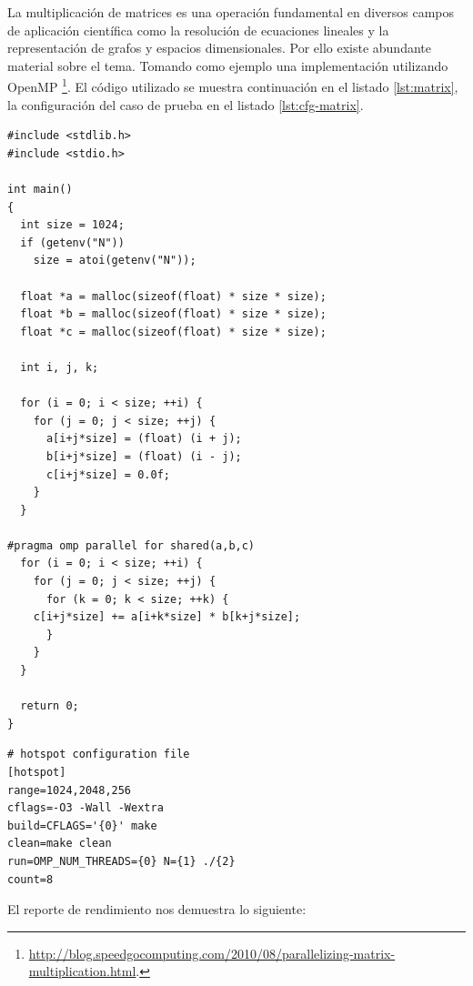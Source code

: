 \documentclass[a4paper]{report}
\begin{document}
La multiplicación de matrices es una operación fundamental en diversos campos de aplicación científica como la resolución de ecuaciones lineales y la representación de grafos y espacios dimensionales. Por ello existe abundante material sobre el tema. Tomando como ejemplo una implementación utilizando OpenMP \footnote{\href{http://blog.speedgocomputing.com/2010/08/parallelizing-matrix-multiplication.html}{http://blog.speedgocomputing.com/2010/08/parallelizing-matrix-multiplication.html}.}. El código utilizado se muestra continuación en el listado \ref{lst:matrix}, la configuración del caso de prueba en el listado \ref{lst:cfg-matrix}.

\bigskip

\begin{lstlisting}[caption={Código de Multiplicación de Matrices},label={lst:matrix}]
#include <stdlib.h>
#include <stdio.h>

int main()
{
  int size = 1024;
  if (getenv("N"))
    size = atoi(getenv("N"));

  float *a = malloc(sizeof(float) * size * size);
  float *b = malloc(sizeof(float) * size * size);
  float *c = malloc(sizeof(float) * size * size);
  
  int i, j, k;

  for (i = 0; i < size; ++i) {
    for (j = 0; j < size; ++j) {
      a[i+j*size] = (float) (i + j);
      b[i+j*size] = (float) (i - j);
      c[i+j*size] = 0.0f;
    }
  }

#pragma omp parallel for shared(a,b,c) 
  for (i = 0; i < size; ++i) {
    for (j = 0; j < size; ++j) {
      for (k = 0; k < size; ++k) {
	c[i+j*size] += a[i+k*size] * b[k+j*size];
      }
    }
  }

  return 0;
}
\end{lstlisting}

\bigskip

\begin{lstlisting}[caption={Caso de Prueba de Multiplicación de Matrices},label={lst:cfg-matrix}]
# hotspot configuration file
[hotspot]
range=1024,2048,256
cflags=-O3 -Wall -Wextra
build=CFLAGS='{0}' make
clean=make clean
run=OMP_NUM_THREADS={0} N={1} ./{2}
count=8
\end{lstlisting}

\bigskip

El reporte de rendimiento nos demuestra lo siguiente:
\end{document}

